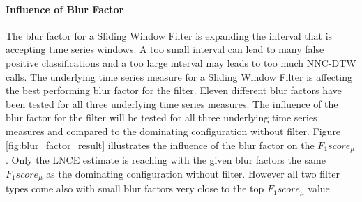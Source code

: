 \paragraph{Influence of Blur Factor} \label{influence_of_blur_factor}
The blur factor for a Sliding Window Filter is expanding the interval that is accepting time series windows. A too small
interval can lead to many false positive classifications and a too large interval may leads to too much NNC-DTW calls.
The underlying time series measure for a Sliding Window Filter is affecting the best performing blur factor for the
filter. Eleven different blur factors have been tested for all three underlying time series measures. The influence of
the blur factor for the filter will be tested for all three underlying time series measures and compared to the
dominating configuration without filter. Figure \ref{fig:blur_factor_result} illustrates the influence of the blur
factor on the $F_{1}score_{\mu}$. Only the LNCE estimate is reaching with the given blur factors the same
$F_{1}score_{\mu}$ as the dominating configuration without filter. However all two filter types come also with small
blur factors very close to the top $F_{1}score_{\mu}$ value.

